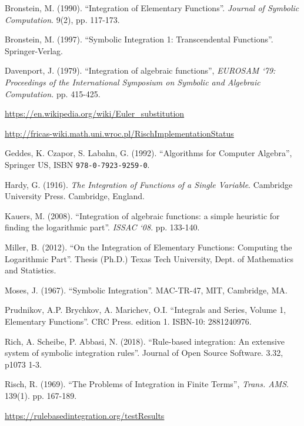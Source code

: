 \documentclass[12pt]{article}
\numberwithin{equation}{section}
\theoremstyle{definition}
\begin{document}
\begin{thebibliography}{99}

 Bronstein, M. (1990). ``Integration of Elementary Functions''. 
\textit{Journal of Symbolic Computation}. 9(2), pp. 117-173.

 Bronstein, M. (1997). ``Symbolic Integration 1: Transcendental Functions''. Springer-Verlag.

 Davenport, J. (1979). ``Integration of algebraic functions'', \textit{EUROSAM `79: Proceedings of the International Symposium on Symbolic and Algebraic Computation. }pp. 415-425.

 \url{https://en.wikipedia.org/wiki/Euler_substitution}

 \url{http://fricas-wiki.math.uni.wroc.pl/RischImplementationStatus}

 Geddes, K. Czapor, S. Labahn, G. (1992). ``Algorithms for Computer Algebra'', Springer US, 
ISBN \verb~978-0-7923-9259-0~.

 Hardy, G. (1916). \textit{The Integration of Functions of a Single Variable}. Cambridge 
University Press. Cambridge, England.

 Kauers, M. (2008). ``Integration of algebraic functions: a simple heuristic for finding the logarithmic part''. \textit{ISSAC `08}. pp. 133-140.

 Miller, B. (2012). ``On the Integration of Elementary Functions: Computing the Logarithmic Part''. Thesis (Ph.D.) Texas Tech University, Dept. of Mathematics and Statistics.

 Moses, J. (1967). ``Symbolic Integration''. MAC-TR-47, MIT, Cambridge, MA.

	Prudnikov, A.P. Brychkov, A. Marichev, O.I. ``Integrals and Series, Volume 1, Elementary Functions''. CRC Press. edition 1. ISBN-10: 2881240976.

 Rich, A. Scheibe, P. Abbasi, N. (2018). ``Rule-based integration: An extensive system of symbolic integration rules''. Journal of Open Source Software. 3.32, p1073 1-3.

 Risch, R. (1969). ``The Problems of Integration in Finite Terms'', \textit{ Trans. AMS}. 139(1). pp. 167-189.

 \url{https://rulebasedintegration.org/testResults}


\end{thebibliography}
\end{document}
